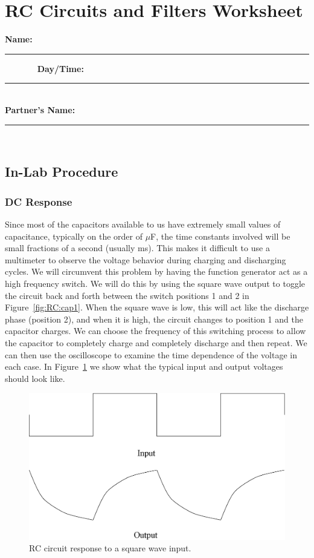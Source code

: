 \clearpage

\renewcommand{\thesection}{\thechapter.W}

\section{RC Circuits and Filters Worksheet}
{\bf \Large Name:}~ \rule{5cm}{.1mm}~~~~~~~
{\bf \Large Day/Time:}~\rule{3cm}{.1mm}\\
{\bf \Large Partner's Name:}~\rule{6cm}{.1mm}\\
 \subsection{In-Lab Procedure}

\subsubsection{DC Response}

Since most of the capacitors available to us have extremely small values of 
capacitance, typically on the order of $\mu$F, the time constants involved will
be small fractions of a second (usually ms). This makes it difficult to use a
multimeter to observe the voltage behavior during charging and discharging 
cycles. We will circumvent this problem by having the function generator act
as a high frequency switch. We will do this by using the square wave output to
toggle the circuit back and forth between the switch positions 1 and 2 in 
Figure~\ref{fig:RC:cap1}. When the square wave is low, this will act like the 
discharge phase (position 2), and when it is high, the circuit changes to 
position 1 and the capacitor charges. We can choose the frequency of this 
switching process to allow the capacitor to completely charge and completely 
discharge and then repeat. We can then use the oscilloscope to examine the time
dependence of the voltage in each case. In Figure~\ref{fig:RC:onoff} we show 
what the typical input and output voltages should look like. \\
\begin{figure}[htb]
\centering 
\epsfxsize=10cm \includegraphics[scale=0.5]{5_rccircuits/squareout.eps}
\caption{RC circuit response to a square wave input.}
\label{fig:RC:onoff}
\end{figure}

